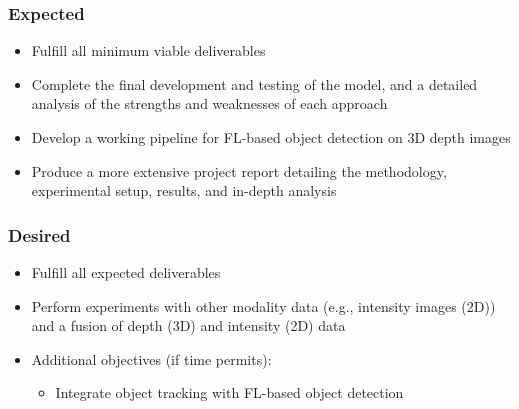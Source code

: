 \documentclass[thesis]{mas_proposal}
\begin{document}
\subsubsection*{Expected}
\begin{itemize}
      \item Fulfill all minimum viable deliverables
      \item Complete the final development and testing of the model, and a detailed analysis of the strengths and weaknesses of each approach
      \item Develop a working pipeline for FL-based object detection on 3D depth images
      \item Produce a more extensive project report detailing the methodology, experimental setup, results, and in-depth analysis

\end{itemize}

\subsubsection*{Desired}
\begin{itemize}
      \item Fulfill all expected deliverables
      \item Perform experiments with other modality data (e.g., intensity images (2D)) and a fusion of depth (3D) and intensity (2D) data
      \item Additional objectives (if time permits):
      \begin{itemize}
            \item Integrate object tracking with FL-based object detection
      \end{itemize}

\end{itemize}


\nocite{*}


\end{document}
